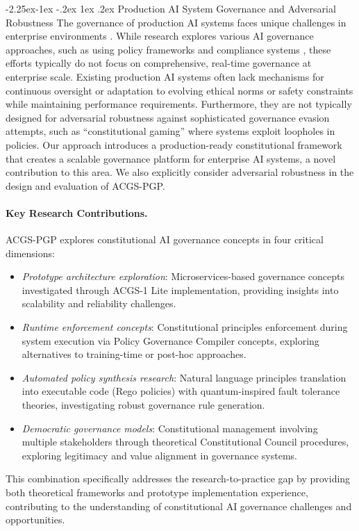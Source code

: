 \documentclass[manuscript,screen,9pt]{acmart}
\makeatletter
\renewcommand\subsection{\@startsection{subsection}{2}{\z@}%
  {-2.25ex\@plus -1ex \@minus -.2ex}%
  {1ex \@plus .2ex}%
  {\normalfont\large\bfseries}}
\makeatother
\begin{document}
\subsection{Production AI System Governance and Adversarial Robustness}
\label{subsec:related_production_governance}
The governance of production AI systems faces unique challenges in enterprise environments \cite{Chauhan2025ECLLMSurvey}. While research explores various AI governance approaches, such as using policy frameworks and compliance systems \cite{Nordin2024LLMGP}, these efforts typically do not focus on comprehensive, real-time governance at enterprise scale. Existing production AI systems often lack mechanisms for continuous oversight or adaptation to evolving ethical norms or safety constraints while maintaining performance requirements. Furthermore, they are not typically designed for adversarial robustness against sophisticated governance evasion attempts, such as ``constitutional gaming'' where systems exploit loopholes in policies. Our approach introduces a production-ready constitutional framework that creates a scalable governance platform for enterprise AI systems, a novel contribution to this area. We also explicitly consider adversarial robustness in the design and evaluation of ACGS-PGP.

\paragraph{Key Research Contributions.} ACGS-PGP explores constitutional AI governance concepts in four critical dimensions:
\begin{itemize}[leftmargin=*,itemsep=1pt,parsep=1pt]
    \item \textit{Prototype architecture exploration}: Microservices-based governance concepts investigated through ACGS-1 Lite implementation, providing insights into scalability and reliability challenges.
    \item \textit{Runtime enforcement concepts}: Constitutional principles enforcement during system execution via Policy Governance Compiler concepts, exploring alternatives to training-time or post-hoc approaches.
    \item \textit{Automated policy synthesis research}: Natural language principles translation into executable code (Rego policies) with quantum-inspired fault tolerance theories, investigating robust governance rule generation.
    \item \textit{Democratic governance models}: Constitutional management involving multiple stakeholders through theoretical Constitutional Council procedures, exploring legitimacy and value alignment in governance systems.
\end{itemize}
This combination specifically addresses the research-to-practice gap by providing both theoretical frameworks and prototype implementation experience, contributing to the understanding of constitutional AI governance challenges and opportunities.
\end{document}
